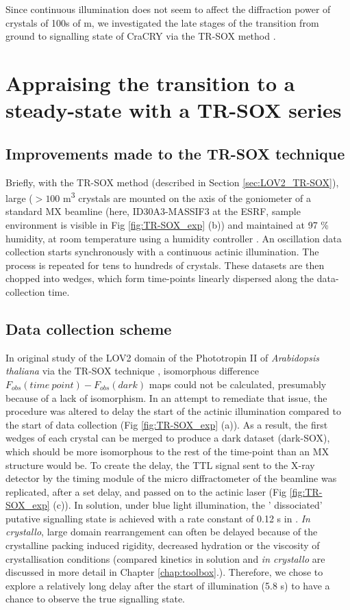 Since continuous illumination does not seem to affect the diffraction power of crystals of 100s of \textmu m, we investigated the late stages of the transition from ground to signalling state of CraCRY via the TR-SOX method \parencite{aumonierMillisecondTimeresolvedSerial2020}. 

\section{Appraising the transition to a steady-state with a TR-SOX series}

\subsection{Improvements made to the TR-SOX technique}
Briefly, with the TR-SOX method (described in Section \ref{sec:LOV2_TR-SOX}), large (\(> 100\) \textmu m\textsuperscript{3} crystals are mounted on the axis of the goniometer of a standard MX beamline (here, ID30A3-MASSIF3 at the ESRF, sample environment is visible in Fig \ref{fig:TR-SOX_exp} (b)) and maintained at 97 \% humidity, at room temperature using a humidity controller \parencite{sanchez-weatherbyImprovingDiffractionHumidity2009}. An oscillation data collection starts synchronously with a continuous actinic illumination. The process is repeated for tens to hundreds of crystals. These datasets are then chopped into wedges, which form time-points linearly dispersed along the data-collection time. 
\subsection{Data collection scheme}
In original study of the LOV2 domain of the Phototropin II of \textit{Arabidopsis thaliana} via the TR-SOX technique \parencite{aumonierMillisecondTimeresolvedSerial2020}, isomorphous difference \(F_{obs}(time\ point) - F_{obs}(dark)\) maps could not be calculated, presumably because of a lack of isomorphism. In an attempt to remediate that issue, the procedure was altered to delay the start of the actinic illumination compared to the start of data collection (Fig \ref{fig:TR-SOX_exp} (a)). As a result, the first wedges of each crystal can be merged to produce a dark dataset (dark-SOX), which should be more isomorphous to the rest of the time-point than an MX structure would be. To create the delay, the TTL signal sent to the X-ray detector by the timing module of the micro diffractometer of the beamline was replicated, after a set delay, and passed on to the actinic laser (Fig \ref{fig:TR-SOX_exp} (c)). 
\vspace{2mm}
In solution, under blue light illumination, the ' dissociated' putative signalling state is achieved with a rate constant of 0.12 s in \cite{zanglTimeResolvedIonMobility2024}. \textit{In crystallo}, large domain rearrangement can often be delayed because of the crystalline packing induced rigidity, decreased hydration or the viscosity of crystallisation conditions (compared kinetics in solution and \textit{in crystallo} are discussed in more detail in Chapter \ref{chap:toolbox}.). Therefore, we chose to explore a relatively long delay after the start of illumination (5.8 s) to have a chance to observe the true signalling state. 

